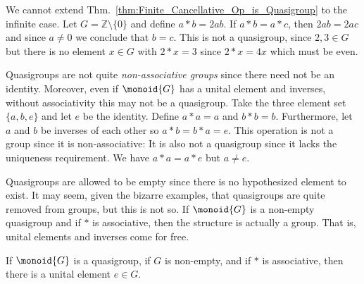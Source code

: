         \begin{example}
            We cannot extend Thm.~\ref{thm:Finite_Cancellative_Op_is_Quasigroup}
            to the infinite case. Let $G=\mathbb{Z}\setminus\{0\}$ and define
            $a*b=2ab$. If $a*b=a*c$, then $2ab=2ac$ and since $a\ne{0}$ we
            conclude that $b=c$. This is not a quasigroup, since
            $2,3\in{G}$ but there is no element $x\in{G}$ with
            $2*x=3$ since $2*x=4x$ which must be even.
        \end{example}
        \begin{example}
            Quasigroups are not quite \textit{non-associative groups} since
            there need not be an identity. Moreover, even if $\monoid{G}$ has a
            unital element and inverses, without associativity this may not be a
            quasigroup. Take the three element set $\{a,b,e\}$ and let $e$ be
            the identity. Define $a*a=a$ and $b*b=b$. Furthermore, let $a$ and
            $b$ be inverses of each other so $a*b=b*a=e$. This operation is
            not a group since it is non-associative:
            \vspace{-2.5ex}
            It is also not a quasigroup since it lacks the uniqueness
            requirement. We have $a*a=a*e$ but $a\ne{e}$.
        \end{example}
        Quasigroups are allowed to be empty since there is no hypothesized
        element to exist. It may seem, given the bizarre examples, that
        quasigroups are quite removed from groups, but this is not so. If
        $\monoid{G}$ is a non-empty quasigroup and if $*$ is associative, then
        the structure is actually a group. That is, unital elements and inverses
        come for free.
        \begin{theorem}
            \label{thm:Non_Empty_Assoc_Quasigroup_Has_Identity}%
            If $\monoid{G}$ is a quasigroup, if $G$ is non-empty, and if $*$ is
            associative, then there is a unital element $e\in{G}$.
        \end{theorem}
